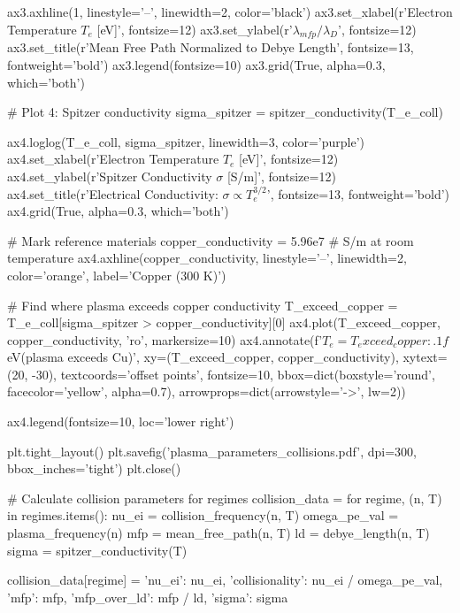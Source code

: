 \documentclass[11pt,a4paper]{article}
\begin{document}
\begin{pycode}
ax3.axhline(1, linestyle='--', linewidth=2, color='black')
ax3.set_xlabel(r'Electron Temperature $T_e$ [eV]', fontsize=12)
ax3.set_ylabel(r'$\lambda_{mfp} / \lambda_D$', fontsize=12)
ax3.set_title(r'Mean Free Path Normalized to Debye Length', fontsize=13, fontweight='bold')
ax3.legend(fontsize=10)
ax3.grid(True, alpha=0.3, which='both')

# Plot 4: Spitzer conductivity
sigma_spitzer = spitzer_conductivity(T_e_coll)

ax4.loglog(T_e_coll, sigma_spitzer, linewidth=3, color='purple')
ax4.set_xlabel(r'Electron Temperature $T_e$ [eV]', fontsize=12)
ax4.set_ylabel(r'Spitzer Conductivity $\sigma$ [S/m]', fontsize=12)
ax4.set_title(r'Electrical Conductivity: $\sigma \propto T_e^{3/2}$', fontsize=13, fontweight='bold')
ax4.grid(True, alpha=0.3, which='both')

# Mark reference materials
copper_conductivity = 5.96e7  # S/m at room temperature
ax4.axhline(copper_conductivity, linestyle='--', linewidth=2, color='orange',
           label='Copper (300 K)')

# Find where plasma exceeds copper conductivity
T_exceed_copper = T_e_coll[sigma_spitzer > copper_conductivity][0]
ax4.plot(T_exceed_copper, copper_conductivity, 'ro', markersize=10)
ax4.annotate(f'$T_e = {T_exceed_copper:.1f}$ eV\n(plasma exceeds Cu)',
            xy=(T_exceed_copper, copper_conductivity),
            xytext=(20, -30), textcoords='offset points',
            fontsize=10, bbox=dict(boxstyle='round', facecolor='yellow', alpha=0.7),
            arrowprops=dict(arrowstyle='->', lw=2))

ax4.legend(fontsize=10, loc='lower right')

plt.tight_layout()
plt.savefig('plasma_parameters_collisions.pdf', dpi=300, bbox_inches='tight')
plt.close()

# Calculate collision parameters for regimes
collision_data = {}
for regime, (n, T) in regimes.items():
    nu_ei = collision_frequency(n, T)
    omega_pe_val = plasma_frequency(n)
    mfp = mean_free_path(n, T)
    ld = debye_length(n, T)
    sigma = spitzer_conductivity(T)

    collision_data[regime] = {
        'nu_ei': nu_ei,
        'collisionality': nu_ei / omega_pe_val,
        'mfp': mfp,
        'mfp_over_ld': mfp / ld,
        'sigma': sigma
    }
\end{pycode}
\end{document}
